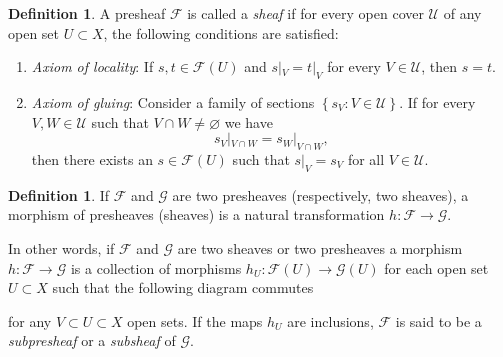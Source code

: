 \documentclass[12pt,a4paper]{book}
\theoremstyle{definition} \newtheorem{defn}[thm]{Definition}
\theoremstyle{definition} \newtheorem{ejemplo}[thm]{Example}
\theoremstyle{definition} \newtheorem{ejercicio}[thm]{Exercise}
\theoremstyle{remark} \newtheorem*{obs}{Remark}
\def\FF{\mathscr{F}}
\begin{document}
    \begin{defn}
      A presheaf $\FF$ is called a \emph{sheaf} if for every open cover $\mathcal{U}$ of any open set $U\subset X$, the following conditions are satisfied:
      \begin{enumerate}
	\item \emph{Axiom of locality}: If $s,t \in \FF(U)$ and $s|_V=t|_V$ for every $V\in \mathcal{U}$, then $s=t$.
	\item \emph{Axiom of gluing}: Consider a family of sections $\left\{ s_V: V\in \mathcal{U} \right\}$. If for every $V,W \in \mathcal{U}$ such that $V\cap W \neq \varnothing$ we have
	  \begin{equation*}
	    s_V|_{V\cap W}=s_W|_{V\cap W},
	  \end{equation*}
	  then there exists an $s\in \FF(U)$ such that $s|_V=s_V$ for all $V\in \mathcal{U}$.
      \end{enumerate}
    \end{defn}

    \begin{defn}
      If $\FF$ and $\mathscr{G}$ are two presheaves (respectively, two sheaves), a morphism of presheaves (sheaves) is a natural transformation $h:\FF\rightarrow \mathscr{G}$. 
    \end{defn}
    In other words, if $\FF$ and $\mathscr{G}$ are two sheaves or two presheaves a morphism $h:\FF \rightarrow \mathscr{G}$ is a collection of morphisms $h_U:\FF(U) \rightarrow \mathscr{G}(U)$ for each open set $U\subset X$ such that the following diagram commutes
    \begin{center}
     \end{center}
     for any $V\subset U \subset X$ open sets. If the maps $h_U$ are inclusions, $\FF$ is said to be a \emph{subpresheaf} or a \emph{subsheaf} of $\mathscr{G}$.
\end{document}
